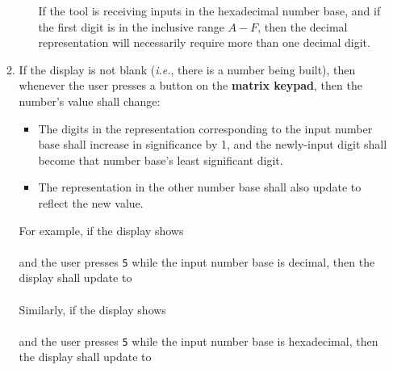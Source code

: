 \begin{enumerate}
\begin{enumerate}
\begin{itemize}
                    If the tool is receiving inputs in the hexadecimal number base, and if the first digit is in the inclusive range $A-F$, then the decimal representation will necessarily require more than one decimal digit.
            \end{itemize}
        \item \label{spec:BuildingValue} If the display is not blank (\textit{i.e.}, there is a number being built), then whenever the user presses a button on the \textbf{matrix keypad}, then the number's value shall change:
            \begin{itemize}
                \item The digits in the representation corresponding to the input number base shall increase in significance by 1, and the newly-input digit shall become that number base's least significant digit.
                \item The representation in the other number base shall also update to reflect the new value.
            \end{itemize}
            For example, if the display shows \\
             \\
            and the user presses \texttt{5} while the input number base is decimal, then the display shall update to \\
             \\
            Similarly, if the display shows \\
             \\
            and the user presses \texttt{5} while the input number base is hexadecimal, then the display shall update to \\
\end{enumerate}
\end{enumerate}
